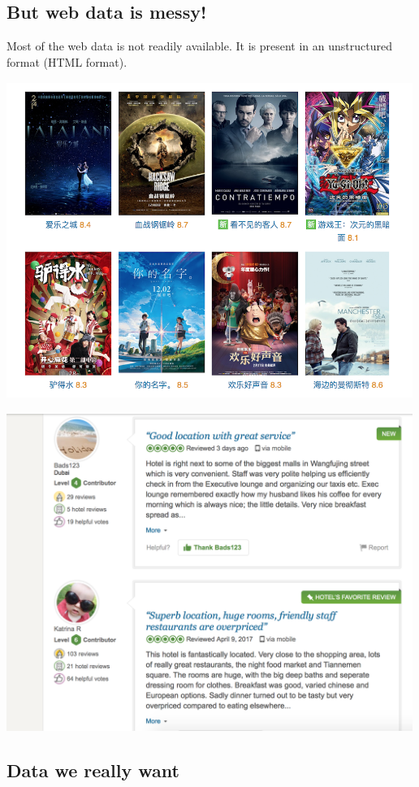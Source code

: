 \subsection{But web data is messy!}\label{but-web-data-is-messy}

Most of the web data is not readily available. It is present in an
unstructured format (HTML format).

\includegraphics[width=5.20833in,height=4.06250in]{douban.png}

\includegraphics[width=5.20833in,height=4.06250in]{HotelReview.png}

\subsection{Data we really want}\label{data-we-really-want}

